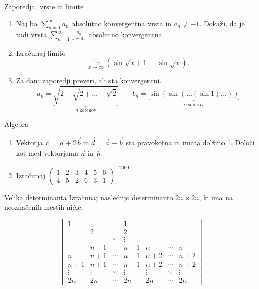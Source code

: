 \begin{frame}{Zaporedja, vrste in limite}
	\begin{enumerate}
		\item 
		Naj bo $\sum _{n=1}^{\infty} a_n$ absolutno konvergentna vrsta in $a_n \ne -1$.
		Dokaži, da je tudi vrsta $\sum_{n=1}^\infty \frac{a_n}{1+a_n}$
		absolutno konvergentna.

		\item
		Izračunaj limito
		$$\lim_{x \rightarrow \infty}(\sin\sqrt{x + 1} - \sin\sqrt{x}).$$

		\item
		Za dani zaporedji preveri, ali sta konvergentni.
		$$ a_n =\underbrace{ \sqrt{2+\sqrt{2+\dots+\sqrt{2}}}}_{n~\text{korenov}} \qquad
		 b_n =\underbrace{ \sin(\sin(\dots(\sin 1)\dots))}_{n~\text{sinusov}}
		$$
	\end{enumerate}
\end{frame}

\begin{frame}{Algebra}
	\begin{enumerate}
		\item
		Vektorja $\vec{c} = \vec{a} + 2\vec{b}~\text{in}~ \vec{d}=\vec{a}-\vec{b} $
		sta pravokotna in imata dolžino 1. Določi kot med vektorjema $\vec{a}$ in $\vec{b}$.
		\item 
		Izračunaj
	$	\begin{pmatrix}
		1 & 2 &3&4&5&6\\
		4&5&2&6&3&1
		\end{pmatrix}^{-2000}
$
	\end{enumerate}
\end{frame}

\begin{frame}{Velika determinanta}
	Izračunaj naslednjo determinanto $2n \times 2n$, ki ima na neoznačenih mestih ničle.

\[
\begin{vmatrix}
1 &  &  & 1 &  &  &  \\
 & 2 &  & 2 &  &  &  \\
 &  & \ddots & \vdots &  &  &  \\
 & n-1 &  & n-1 & n & \cdots & n \\
n & n+1 & \cdots & n+1 & n+2 & \cdots & n+2 \\
n+1 & n+1 & \cdots & n+1 & n+2 & \cdots & n+2 \\
\vdots & \vdots & \ddots & \vdots & \vdots & \ddots & \vdots \\
2n & 2n & \cdots & 2n & 2n & \cdots & 2n
\end{vmatrix}
\]


\end{frame}

